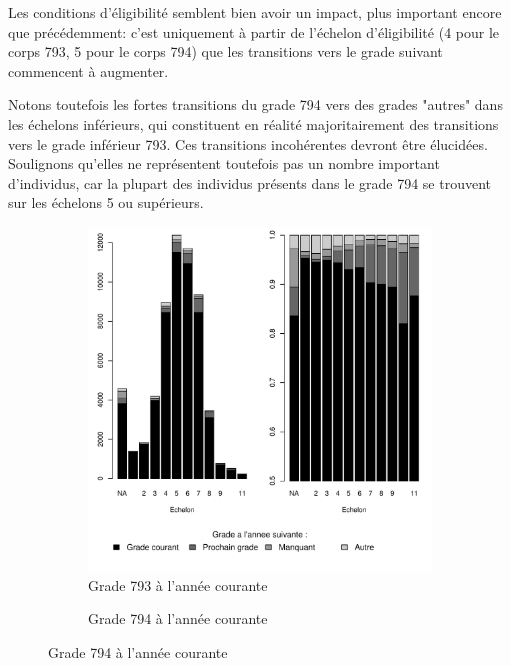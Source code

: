 \documentclass[11pt,a4paper]{article}
\begin{document}
Les conditions d'éligibilité semblent bien avoir un impact, plus important encore que précédemment: c'est uniquement à partir de l'échelon d'éligibilité (4 pour le corps 793, 5 pour le corps 794) que les transitions vers le grade suivant commencent à augmenter.  

Notons toutefois les fortes transitions du grade 794 vers des grades "autres" dans les échelons inférieurs, qui constituent en réalité majoritairement des transitions vers le grade inférieur 793. Ces transitions incohérentes devront être élucidées. Soulignons qu'elles ne représentent toutefois pas un nombre important d'individus, car la plupart des individus présents dans le grade 794 se trouvent sur les échelons  5 ou supérieurs. 

\bigskip

\begin{figure}[ht] 
  \caption{Situation d'une année à l'autre, selon l'échelon}
  \label{evo_by_ech_AT} 
  \begin{subfigure}[b]{0.5\linewidth}
      \caption{Grade 793 à l'année courante}
    \label{evo_by_ech_793} 
    \centering
    \includegraphics[width=1\linewidth]{AT_hazard_by_ech_793.pdf} 
  \end{subfigure}
  \begin{subfigure}[b]{0.5\linewidth}
        \caption{Grade 794 à l'année courante} 

\end{subfigure}
\end{figure}
\end{document}
